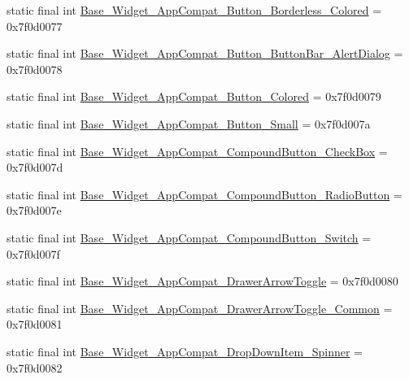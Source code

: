 \begin{DoxyCompactItemize}
\item 
static final int \mbox{\hyperlink{classcom_1_1synnapps_1_1carouselview_1_1_r_1_1style_a5df63e71252733bf247d4243ad6ca9a6}{Base\+\_\+\+Widget\+\_\+\+App\+Compat\+\_\+\+Button\+\_\+\+Borderless\+\_\+\+Colored}} = 0x7f0d0077
\item 
static final int \mbox{\hyperlink{classcom_1_1synnapps_1_1carouselview_1_1_r_1_1style_ae152855ed2899e2700577ae75b5865d0}{Base\+\_\+\+Widget\+\_\+\+App\+Compat\+\_\+\+Button\+\_\+\+Button\+Bar\+\_\+\+Alert\+Dialog}} = 0x7f0d0078
\item 
static final int \mbox{\hyperlink{classcom_1_1synnapps_1_1carouselview_1_1_r_1_1style_a53b6a7509a290196fcd8ab6a90600893}{Base\+\_\+\+Widget\+\_\+\+App\+Compat\+\_\+\+Button\+\_\+\+Colored}} = 0x7f0d0079
\item 
static final int \mbox{\hyperlink{classcom_1_1synnapps_1_1carouselview_1_1_r_1_1style_a3f70674df1835b9b5c197d391b6d10dc}{Base\+\_\+\+Widget\+\_\+\+App\+Compat\+\_\+\+Button\+\_\+\+Small}} = 0x7f0d007a
\item 
static final int \mbox{\hyperlink{classcom_1_1synnapps_1_1carouselview_1_1_r_1_1style_a9e1579a7327fdfb01399321c91511c4a}{Base\+\_\+\+Widget\+\_\+\+App\+Compat\+\_\+\+Compound\+Button\+\_\+\+Check\+Box}} = 0x7f0d007d
\item 
static final int \mbox{\hyperlink{classcom_1_1synnapps_1_1carouselview_1_1_r_1_1style_af43f36d3d5ca97382625a520d069c7bd}{Base\+\_\+\+Widget\+\_\+\+App\+Compat\+\_\+\+Compound\+Button\+\_\+\+Radio\+Button}} = 0x7f0d007e
\item 
static final int \mbox{\hyperlink{classcom_1_1synnapps_1_1carouselview_1_1_r_1_1style_ab5d5c4ae785949d854509e2f03df10a8}{Base\+\_\+\+Widget\+\_\+\+App\+Compat\+\_\+\+Compound\+Button\+\_\+\+Switch}} = 0x7f0d007f
\item 
static final int \mbox{\hyperlink{classcom_1_1synnapps_1_1carouselview_1_1_r_1_1style_aac2324a272d4a40f9889a2e956d562fe}{Base\+\_\+\+Widget\+\_\+\+App\+Compat\+\_\+\+Drawer\+Arrow\+Toggle}} = 0x7f0d0080
\item 
static final int \mbox{\hyperlink{classcom_1_1synnapps_1_1carouselview_1_1_r_1_1style_a5bf4f17cbe34144cab1842ff9185cc04}{Base\+\_\+\+Widget\+\_\+\+App\+Compat\+\_\+\+Drawer\+Arrow\+Toggle\+\_\+\+Common}} = 0x7f0d0081
\item 
static final int \mbox{\hyperlink{classcom_1_1synnapps_1_1carouselview_1_1_r_1_1style_a2b4a8f9368b616c6cae36b1e0db5c0d6}{Base\+\_\+\+Widget\+\_\+\+App\+Compat\+\_\+\+Drop\+Down\+Item\+\_\+\+Spinner}} = 0x7f0d0082

\end{DoxyCompactItemize}
